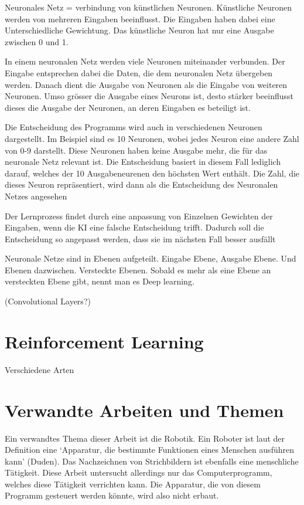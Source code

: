 Neuronales Netz = verbindung von künstlichen Neuronen. Künstliche Neuronen
werden von mehreren Eingaben beeinflusst. Die Eingaben haben dabei eine
Unterschiedliche Gewichtung. Das künstliche Neuron hat nur eine Ausgabe zwischen
0 und 1.

In einem neuronalen Netz werden viele Neuronen miteinander verbunden. Der
Eingabe entsprechen dabei die Daten, die dem neuronalen Netz übergeben werden.
Danach dient die Ausgabe von Neuronen als die Eingabe von weiteren Neuronen.
Umso grösser die Ausgabe eines Neurons ist, desto stärker beeinflusst dieses die
Ausgabe der Neuronen, an deren Eingaben es beteiligt ist.

Die Entscheidung des Programms wird auch in verschiedenen Neuronen dargestellt.
Im Beispiel sind es 10 Neuronen, wobei jedes Neuron eine andere Zahl von 0-9
darstellt. Diese Neuronen haben keine Ausgabe mehr, die für das neuronale Netz
relevant ist. Die Entscheidung basiert in diesem Fall lediglich darauf, welches
der 10 Ausgabeneurenen den höchsten Wert enthält. Die Zahl, die dieses Neuron
repräsentiert, wird dann als die Entscheidung des Neuronalen Netzes angesehen

Der Lernprozess findet durch eine anpassung von Einzelnen Gewichten der
Eingaben, wenn die KI eine falsche Entscheidung trifft. Dadurch soll die
Entscheidung so angepasst werden, dass sie im nächsten Fall besser ausfällt

Neuronale Netze sind in Ebenen aufgeteilt. Eingabe Ebene, Ausgabe Ebene. Und
Ebenen dazwischen. Versteckte Ebenen. Sobald es mehr als eine Ebene an
versteckten Ebene gibt, nennt man es Deep learning.

(Convolutional Layers?)




\section{Reinforcement Learning}
\label{chap:t_rl}
Verschiedene Arten


\section{Verwandte Arbeiten und Themen}
\label{chap:t_verwandt}

Ein verwandtes Thema dieser Arbeit ist die Robotik. Ein Roboter ist laut der
Definition eine `Apparatur, die bestimmte Funktionen eines Menschen ausführen
kann' (Duden). Das Nachzeichnen von Strichbildern ist ebenfalls eine menschliche
Tätigkeit. Diese Arbeit untersucht allerdings nur das Computerprogramm, welches
diese Tätigkeit verrichten kann. Die Apparatur, die von diesem Programm
gesteuert werden könnte, wird also nicht erbaut.

